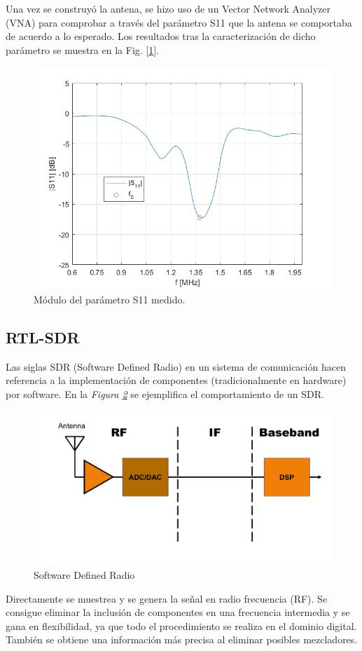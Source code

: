 \documentclass[a4paper,openright,12pt]{article}
\begin{document}
Una vez se construyó la antena, se hizo uso de un Vector Network Analyzer (VNA) para comprobar a través del parámetro S11 que la antena se comportaba de acuerdo a lo esperado. Los resultados tras la caracterización de dicho parámetro se muestra en la Fig. [\ref{fig:S11}].
\begin{figure}[h!]
    \centering
    \includegraphics[width=0.55\linewidth]{imagenes/S11.png}
    \caption{Módulo del parámetro S11 medido.}
    \label{fig:S11}
\end{figure}


	\subsection{RTL-SDR}
	Las siglas SDR (Software Defined Radio) en un sistema de comunicación hacen referencia a la implementación de componentes (tradicionalmente en hardware) por software. En la \textit{Figura \ref{SDR}} se ejemplifica el comportamiento de un SDR.
	
 \begin{figure}[hbtp]
 \centering
 \includegraphics[width = 12cm]{imagenes/sdr.jpg}
 \caption{Software Defined Radio}
 \label{SDR}
 \end{figure}

Directamente se muestrea y se genera la señal en radio frecuencia (RF). Se consigue eliminar la inclusión de componentes en una frecuencia intermedia y se gana en flexibilidad, ya que todo el procedimiento se realiza en el dominio digital. También se obtiene una información más precisa al eliminar posibles mezcladores.
\end{document}
